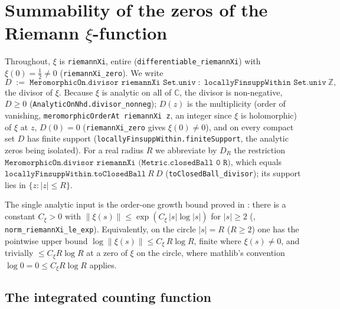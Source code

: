 %
%
%

\chapter{Summability of the zeros of the Riemann \texorpdfstring{$\xi$}{xi}-function}
\label{cha:zero_summability}

Throughout, $\xi$ is \texttt{riemannXi}, entire
(\texttt{differentiable\_riemannXi}) with $\xi(0)=\tfrac12\neq0$
(\texttt{riemannXi\_zero}). We write
\[
  D \;:=\; \texttt{MeromorphicOn.divisor riemannXi Set.univ}
  \;:\; \texttt{locallyFinsuppWithin Set.univ}\ \mathbb Z,
\]
the divisor of $\xi$. Because $\xi$ is analytic on all of $\mathbb C$, the divisor is
non-negative, $D\ge0$ (\texttt{AnalyticOnNhd.divisor\_nonneg}); $D(z)$ is the
multiplicity (order of vanishing, \texttt{meromorphicOrderAt riemannXi z}, an integer
since $\xi$ is holomorphic) of $\xi$ at $z$, $D(0)=0$ (\texttt{riemannXi\_zero} gives
$\xi(0)\neq0$), and on every compact set $D$ has finite support
(\texttt{locallyFinsuppWithin.finiteSupport}, the analytic zeros being isolated). For a
real radius $R$ we abbreviate by $D_R$ the restriction
$\texttt{MeromorphicOn.divisor riemannXi (Metric.closedBall 0\ R)}$, which equals
$\texttt{locallyFinsuppWithin.toClosedBall}\ R\ D$ (\texttt{toClosedBall\_divisor}); its
support lies in $\{z:|z|\le R\}$.

The single analytic input is the order-one growth bound proved in :
there is a constant $C_\xi>0$ with $\|\xi(s)\|\le\exp(C_\xi\,|s|\log|s|)$ for $|s|\ge2$
(, \texttt{norm\_riemannXi\_le\_exp}). Equivalently, on
the circle $|s|=R$ ($R\ge2$) one has the pointwise upper bound $\log\|\xi(s)\|\le
C_\xi\,R\log R$, finite where $\xi(s)\neq0$, and trivially $\le C_\xi R\log R$ at a zero
of $\xi$ on the circle, where mathlib's convention $\log 0=0\le C_\xi R\log R$ applies.

\section{The integrated counting function}
\label{sec:zs_jensen}

